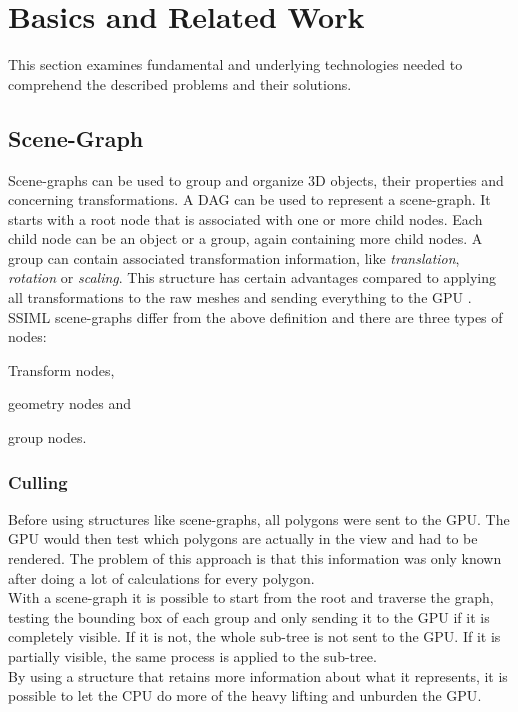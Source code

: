 
\section{Basics and Related Work}
\label{basics-and-related-work}


This section examines fundamental and underlying technologies needed to comprehend the described problems and their solutions. 

\subsection{Scene-Graph}\label{scene-graph}

Scene-graphs can be used to group and organize \gls{3D} objects, their properties and
concerning transformations. A \gls{DAG} can be used to represent a scene-graph.
It starts with a root node that is associated with one or more child nodes. Each
child node can be an object or a group, again containing more child nodes. A group can
contain associated transformation information, like \emph{translation},
\emph{rotation} or \emph{scaling}. This structure has certain advantages
compared to applying all transformations to the raw meshes and sending
everything to the \gls{GPU} \cite{realityprime}. \gls{SSIML} scene-graphs differ from the
above definition and there are three types of nodes:

\begin{itemize*}
  \item Transform nodes,
  \item geometry nodes and
  \item group nodes.
\end{itemize*}

\subsubsection{Culling}\label{culling}

Before using structures like scene-graphs, all polygons were sent to
the \gls{GPU}. The \gls{GPU} would then test which polygons are actually in the
view and had to be rendered. The problem of this approach is
that this information was only known after doing a lot of calculations
for every polygon.\\
With a scene-graph it is possible to start from the root and traverse the
graph, testing the bounding box of each group and only sending it to the
\gls{GPU} if it is completely visible. If it is not, the whole sub-tree is not
sent to the \gls{GPU}. If it is partially visible, the same process is applied
to the sub-tree.\\
By using a structure that retains more information about what it
represents, it is possible to let the CPU do more of the heavy
lifting and unburden the \gls{GPU}.

